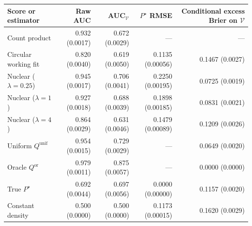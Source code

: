 \begin{tabular}{lrrrr}
\toprule
Score or estimator & Raw AUC & AUC$_{\mathcal V}$ & $P^\star$ RMSE & \shortstack{Conditional excess\\Brier on $\mathcal V$} \\
\midrule
Count product & 0.932 (0.0017) & 0.672 (0.0029) & --- & --- \\
Circular working fit & 0.820 (0.0040) & 0.619 (0.0050) & 0.1135 (0.00056) & 0.1467 (0.0027) \\
Nuclear ($\lambda=0.25$) & 0.945 (0.0017) & 0.706 (0.0041) & 0.2250 (0.00195) & 0.0725 (0.0019) \\
Nuclear ($\lambda=1$) & 0.927 (0.0018) & 0.688 (0.0039) & 0.1898 (0.00185) & 0.0831 (0.0021) \\
Nuclear ($\lambda=4$) & 0.864 (0.0029) & 0.631 (0.0046) & 0.1479 (0.00089) & 0.1209 (0.0026) \\
Uniform $Q^{\mathrm{unif}}$ & 0.954 (0.0015) & 0.729 (0.0029) & --- & 0.0649 (0.0020) \\
Oracle $Q^{\mathrm{or}}$ & 0.979 (0.0011) & 0.875 (0.0057) & --- & 0.0000 (0.0000) \\
True $P^\star$ & 0.692 (0.0044) & 0.697 (0.0056) & 0.0000 (0.00000) & 0.1157 (0.0020) \\
Constant density & 0.500 (0.0000) & 0.500 (0.0000) & 0.1173 (0.00015) & 0.1620 (0.0029) \\
\bottomrule
\end{tabular}
